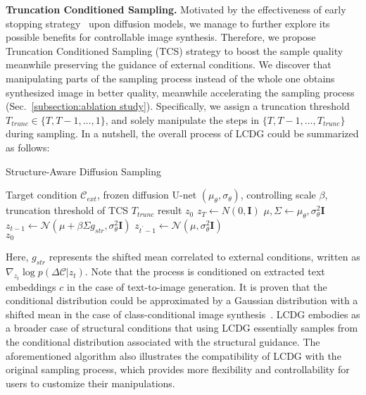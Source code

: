 \documentclass{article}
\begin{document}
\textbf{Truncation Conditioned Sampling.} Motivated by the effectiveness of early stopping strategy~\cite{lyu2022accelerating} upon diffusion models, we manage to further explore its possible benefits for controllable image synthesis. Therefore, we propose Truncation Conditioned Sampling (TCS) strategy to boost the sample quality meanwhile preserving the guidance of external conditions. We discover that manipulating parts of the sampling process instead of the whole one obtains 
synthesized image in better quality, meanwhile accelerating the sampling process (Sec.~\ref{subsection:ablation study}). Specifically, we assign a truncation threshold $T_{trunc} \in \{T, T-1, \dots, 1\}$, and solely manipulate the steps in $\{T, T-1, \dots, T_{trunc}\}$ during sampling. In a nutshell, the overall process of LCDG could be summarized as follows:
\vspace{-0.5em}
\begin{algorithm}[H]
\renewcommand{\algorithmicrequire}{\textbf{Input:}}
    \renewcommand{\algorithmicensure}{\textbf{Output:}}
    \caption{Structure-Aware Diffusion Sampling}
    \begin{algorithmic}
    \label{algorithm: LCDG sampling}
        \Require Target condition $\mathcal{C}_{ext}$, frozen diffusion U-net $(\mu_\theta, \sigma_\theta)$, controlling scale $
        \beta$, truncation threshold of TCS $T_{trunc}$
        \Ensure result $z_0$
        \State $z_T \leftarrow N(0, \mathbf{I})$
        \State $\mu, \Sigma \leftarrow \mu_\theta, \sigma_\theta^2 \mathbf{I}$
         \textcolor{blue}{}
        \State \qquad $z_{t-1} \leftarrow \mathcal{N} (\mu + \beta \Sigma g_{str}, \sigma_\theta^2\mathbf{I})$
        \EndFor
         \textcolor{blue}{}
        \State \qquad $z_{t^{\prime}-1} \leftarrow \mathcal{N} (\mu, \sigma_\theta^2\mathbf{I})$
        \EndFor\\
        \Return $z_0$
    \end{algorithmic}
\end{algorithm}
\vspace{-1em}
Here, $g_{str}$ represents the shifted mean correlated to external conditions, written as $\nabla_{z_t} \log p(\Delta \mathcal{C}|z_t)$. Note that the process is conditioned on extracted text embeddings $c$ in the case of text-to-image generation. It is proven that the conditional distribution could be approximated by a Gaussian distribution with a shifted mean in the case of class-conditional image synthesis~\cite{dhariwal2021diffusion}. LCDG embodies as a broader case of structural conditions that using LCDG essentially samples from the conditional distribution associated with the structural guidance. The aforementioned algorithm also 
illustrates the compatibility of LCDG with the original sampling process, which provides more flexibility and controllability for users to customize their manipulations. 
\end{document}
